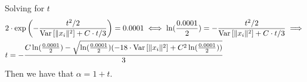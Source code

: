 \documentclass[a4paper,12pt]{article}
\begin{document}
Solving for $t$
\begin{align*}
&2 \cdot \exp \left (- \frac{t^2/2}{\text{Var} \left [ \|x_i\|^2  \right] + C \cdot t/3}\right) = 0.0001
\iff \ln(\frac{0.0001}{2}) = -\frac{t^2/2}{\text{Var} \left [ \|x_i\|^2  \right] + C \cdot t/3}
\implies \\ &t = - \frac{C \ln(\frac{0.0001}{2}) - 
\sqrt{\ln(\frac{0.0001}{2})(-18 \cdot \text{Var} \left [ \|x_i\|^2  \right] + C^2\ln(\frac{0.0001}{2}))}}{3}
\end{align*}
Then we have that $\alpha = 1 + t$.



{}

\end{document}
